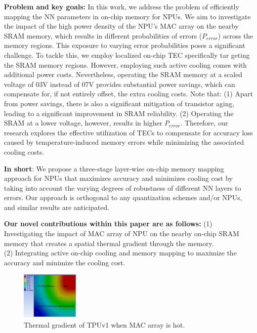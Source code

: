 \documentclass[sigconf]{acmart}
\begin{document}
\textbf{Problem and key goals:} In this work, we address the problem of efficiently mapping the NN parameters in on-chip memory for NPUs. We aim to investigate the impact of the high power density of the NPU’s MAC array on the nearby SRAM memory, which results in different probabilities of errors ($P_{error}$) across the memory regions. This exposure to varying error probabilities poses a significant challenge. To tackle this, we employ localized on-chip TEC specifically tar geting the SRAM memory regions. However, employing such active cooling comes with additional power costs. Nevertheless, operating the SRAM memory at a scaled voltage of 03V instead of 07V provides substantial power savings, which can compensate for, if not entirely offset, the extra cooling costs. Note that: (1) Apart from power savings, there is also a significant mitigation of transistor aging, leading to a significant improvement in SRAM reliability. (2) Operating the SRAM at a lower voltage, however, results in higher $P_{error}$. Therefore, our research explores the effective utilization of TECs to compensate for accuracy loss caused by temperature-induced memory errors while minimizing the associated cooling costs. 

\textbf{In short}: We propose a three-stage layer-wise on-chip memory mapping approach for NPUs that maximizes accuracy and minimizes cooling cost by taking into account the varying degrees of robustness of different NN layers to errors. Our approach is orthogonal to any quantization schemes and/or NPUs, and similar results are anticipated. 

\textbf{Our novel contributions within this paper are as follows:} (1) Investigating the impact of MAC array of NPU on the nearby on-chip SRAM memory that creates a spatial thermal gradient through the memory. \\ (2) Integrating active on-chip cooling and memory mapping to maximize the accuracy and minimize the cooling cost.

\begin{figure}[t] %
    \centering
    \includegraphics[width=0.25\textwidth]{Figures/Picture1.jpg} %
    \caption{Thermal gradient of TPUv1 when MAC array is hot.}
    \label{Thermal gradient of TPUv1 when MAC array is hot.}
\end{figure}
\end{document}
